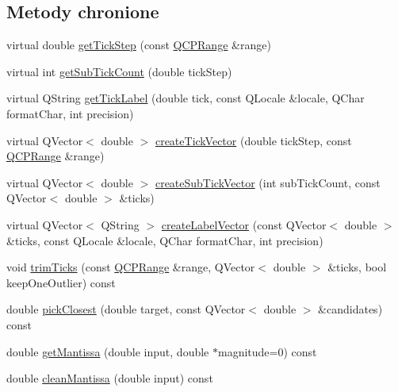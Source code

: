 \subsection*{Metody chronione}
\begin{DoxyCompactItemize}
\item 
virtual double \hyperlink{class_q_c_p_axis_ticker_a910d69bcec2de37e92d8d4e1ecf201e2}{get\+Tick\+Step} (const \hyperlink{class_q_c_p_range}{Q\+C\+P\+Range} \&range)
\item 
virtual int \hyperlink{class_q_c_p_axis_ticker_a4ccc403ced7a1457ce6ba293509933c8}{get\+Sub\+Tick\+Count} (double tick\+Step)
\item 
virtual Q\+String \hyperlink{class_q_c_p_axis_ticker_a8201eb4aa8be192bf786b126eb5ee089}{get\+Tick\+Label} (double tick, const Q\+Locale \&locale, Q\+Char format\+Char, int precision)
\item 
virtual Q\+Vector$<$ double $>$ \hyperlink{class_q_c_p_axis_ticker_af4645a824c7bd2ca8fc7e86ebf9055bd}{create\+Tick\+Vector} (double tick\+Step, const \hyperlink{class_q_c_p_range}{Q\+C\+P\+Range} \&range)
\item 
virtual Q\+Vector$<$ double $>$ \hyperlink{class_q_c_p_axis_ticker_a9a6435723fa0bd366d1ea4c2cff7c33f}{create\+Sub\+Tick\+Vector} (int sub\+Tick\+Count, const Q\+Vector$<$ double $>$ \&ticks)
\item 
virtual Q\+Vector$<$ Q\+String $>$ \hyperlink{class_q_c_p_axis_ticker_a804050e408f37a0b9770c6654ebe6aa7}{create\+Label\+Vector} (const Q\+Vector$<$ double $>$ \&ticks, const Q\+Locale \&locale, Q\+Char format\+Char, int precision)
\item 
void \hyperlink{class_q_c_p_axis_ticker_a7eaaf1a0bf7807fe95e36d40e3b3ed65}{trim\+Ticks} (const \hyperlink{class_q_c_p_range}{Q\+C\+P\+Range} \&range, Q\+Vector$<$ double $>$ \&ticks, bool keep\+One\+Outlier) const 
\item 
double \hyperlink{class_q_c_p_axis_ticker_ae967cfb82e329d834a50c6f1f0d2a33d}{pick\+Closest} (double target, const Q\+Vector$<$ double $>$ \&candidates) const 
\item 
double \hyperlink{class_q_c_p_axis_ticker_a791ecd8c1a9c000f8e7fdb2578aca257}{get\+Mantissa} (double input, double $\ast$magnitude=0) const 
\item 
double \hyperlink{class_q_c_p_axis_ticker_a534f5a2c9f8565c602a5423e944c7747}{clean\+Mantissa} (double input) const 
\end{DoxyCompactItemize}
